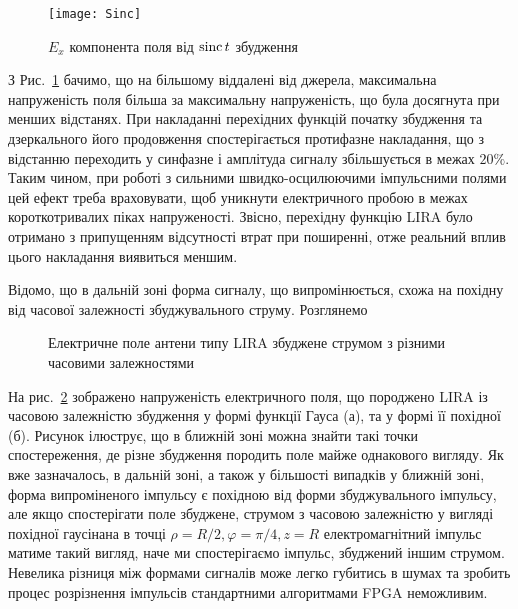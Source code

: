 \begin{figure}[h] \begin{center}
\texttt{[image: Sinc]}
\caption{$ E_x $ компонента поля від $ \operatorname{sinc} t $ збудження}
\label{fig:ex_sinc}
\end{center} \end{figure}

З Рис.~\ref{fig:ex_sinc} бачимо, що на більшому віддалені від джерела, 
максимальна напруженість поля більша за максимальну напруженість, що була 
досягнута при менших відстанях. При накладанні перехідних функцій початку 
збудження та дзеркального його продовження спостерігається протифазне 
накладання, що з відстанню переходить у синфазне і амплітуда сигналу 
збільшується в межах $ 20\% $. Таким чином, при роботі з сильними 
швидко-осцилюючими імпульсними полями цей ефект треба враховувати, щоб 
уникнути електричного пробою в межах короткотривалих піках напруженості.
Звісно, перехідну функцію LIRA було отримано з припущенням відсутності 
втрат при поширенні, отже реальний вплив цього накладання виявиться 
меншим.

Відомо, що в дальній зоні форма сигналу, що випромінюється, схожа на похідну
від часової залежності збуджувального струму. Розглянемо 

\begin{figure}
\caption{Електричне поле антени типу LIRA збуджене струмом з 
різними часовими залежностями}
\label{fig:gauss_shape}
\end{figure}

На рис.~\ref{fig:gauss_shape} зображено напруженість електричного поля, 
що породжено LIRA із часовою залежністю збудження у формі функції Гауса (а), 
та у формі її похідної (б). Рисунок ілюструє, що в ближній зоні можна знайти
такі точки спостереження, де різне збудження породить поле майже однакового 
вигляду. Як вже зазначалось, в дальній зоні, а також у більшості випадків у 
ближній зоні, форма випроміненого імпульсу є похідною від форми збуджувального 
імпульсу, але якщо спостерігати поле збуджене, струмом з часовою залежністю у 
вигляді похідної гаусінана в точці $ \rho = R/2, \varphi = \pi/4, z = R $
електромагнітний імпульс матиме такий вигляд, наче ми спостерігаємо імпульс, 
збуджений іншим струмом. Невелика різниця між формами сигналів може легко 
губитись в шумах та зробить процес розрізнення імпульсів стандартними 
алгоритмами FPGA неможливим.

